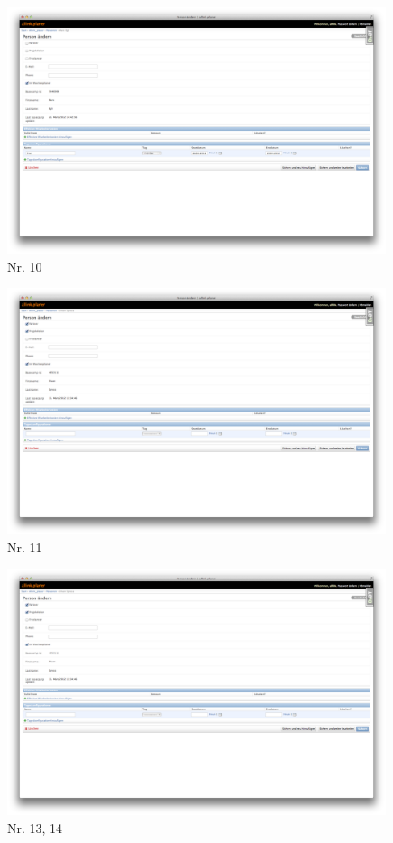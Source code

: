 \begin{figure}[htbp]
    \centering
        \includegraphics[width=0.99\textwidth,angle=0]{bilder/testing/Sperrtag_bearbeiten.png}
    \caption{Nr. 10}
    \label{fig:bilder_testing_Sperrtag_bearbeiten}
\end{figure}
\begin{figure}[htbp]
    \centering
        \includegraphics[width=0.99\textwidth,angle=0]{bilder/testing/Sperrtag_loeschen.png}
    \caption{Nr. 11}
    \label{fig:bilder_testing_Sperrtag_loeschen}
\end{figure}
\begin{figure}[htbp]
    \centering
        \includegraphics[width=0.99\textwidth,angle=0]{bilder/testing/Person_wochenplaner_partner.png}
    \caption{Nr. 13, 14}
    \label{fig:bilder_testing_Person_wochenplaner_partner}
\end{figure}
